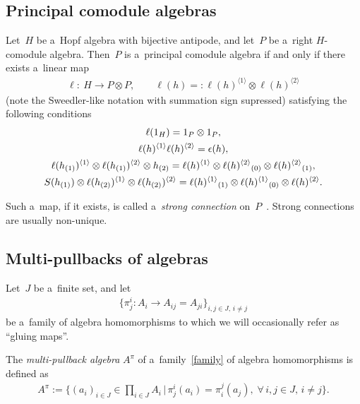 \documentclass[11pt]{article}
\def\sw#1{{\sb{(#1)}}}
\newcommand{\ls}[1]{\ell(#1)^{\langle 1\rangle}}
\newcommand{\rs}[1]{\ell(#1)^{\langle 2\rangle}}
\begin{document}
\subsection{Principal comodule algebras}

Let~$H$ be a~Hopf algebra with bijective antipode, and let~$P$ be a~right $H$-comodule algebra.
Then~$P$ is a~principal comodule algebra if and only if there exists a~linear map
\begin{gather*}
\ell: \ H\rightarrow P\otimes P,
\qquad
\ell(h)=:\ls{h}\otimes\rs{h}
\end{gather*}
(note the Sweedler-like notation with summation sign supressed) satisfying the following conditions
\begin{subequations}
\label{el-prop}
\begin{gather}
\ell(1_H)=1_P\otimes1_P,
\label{el-unitality}
\\
\ls{h}\rs{h}={\epsilon}(h),
\label{el-collapse}
\\
\ls{h\sw{1}}\otimes\rs{h\sw{1}}\otimes h\sw{2}=\ls{h}\otimes\rs{h}\sw{0}\otimes\rs{h}\sw{1},
\label{el-rcolinear}
\\
S(h\sw{1})\otimes\ls{h\sw{2}}\otimes\rs{h\sw{2}}=\ls{h}\sw{1}\otimes\ls{h}\sw{0}\otimes\rs{h}.
\label{el-lcolinear}
\end{gather}
\end{subequations}

Such a~map, if it exists, is called a~{\em strong connection} on~$P$~\cite{bh04,dgh01, h-pm96}.
Strong connections are usually non-unique.

\subsection{Multi-pullbacks of algebras}

Let~$J$ be a~f\/inite set, and let
\begin{gather}
\label{family}
\big\{\pi^i_j:A_i\longrightarrow A_{ij}=A_{ji}\big\}_{i,j\in J,\,i\neq j}
\end{gather}
be a~family of algebra homomorphisms to which we will occasionally refer as ``gluing maps''.
\begin{definition}
[\cite{CM2000,GK-P99}] The \emph{multi-pullback algebra} $A^\pi$ of a~family~\eqref{family} of algebra homomorphisms is
def\/ined as
\begin{gather*}
A^\pi:=\bigg\{ (a_i)_{i\in J}\in\prod\limits_{i\in J}A_i
\,
\bigg|
\,
\pi^i_j(a_i)=\pi^j_i(a_j),
\;
\forall\, i,j\in J,\, i\neq j \bigg\}.
\end{gather*}
\end{definition}
\end{document}
